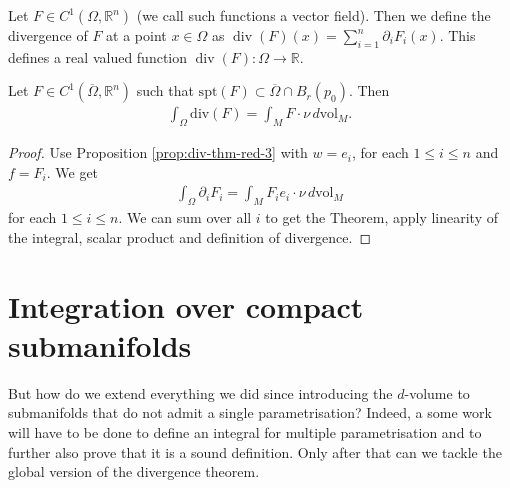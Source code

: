 \begin{definition}[Divergence]\label{def:divergence}
	Let $F \in C^{1}(\Omega, \mathbb{R}^{n})$ (we call such functions a vector field). Then we define the divergence of $F$ at a point $x \in \Omega$ as $\operatorname{div}(F)(x) = \sum_{i=1}^{n} \partial_{i}F_{i}(x)$. This defines a real valued function $\operatorname{div}(F): \Omega \to \mathbb{R}$.
\end{definition}

\begin{theorem}\label{thm:div-thm-loc}
	Let $F \in C^{1}(\overline{ \Omega }, \mathbb{R}^{n})$ such that $\text{spt}(F) \subset \overline{ \Omega } \cap B_{r}(p_{0})$. Then
	\begin{align*}
		\int_{\Omega} \text{div}(F) = \int_{M} F \cdot \nu \, d \text{vol}_{M}.
	\end{align*}
\end{theorem}
\begin{proof}
	Use Proposition \ref{prop:div-thm-red-3} with $w = e_{i}$, for each $1 \leq i \leq n$ and $f = F_{i}$. We get
	\begin{align*}
		\int_{\Omega} \partial_{i} F_{i} = \int_{M} F_{i} e_{i} \cdot \nu \, d \text{vol}_{M}
	\end{align*}
	for each $1 \leq i \leq n$. We can sum over all $i$ to get the Theorem, apply linearity of the integral, scalar product and definition of divergence.
\end{proof}

\section{Integration over compact submanifolds}

But how do we extend everything we did since introducing the $d$-volume to submanifolds that do not admit a single parametrisation? Indeed, a some work will have to be done to define an integral for multiple parametrisation and to further also prove that it is a sound definition. Only after that can we tackle the global version of the divergence theorem.

